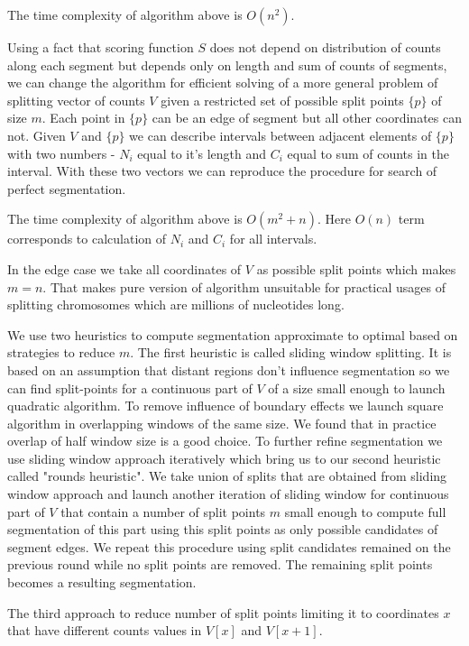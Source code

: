 \documentclass[10pt,letterpaper]{article}
\begin{document}
The time complexity of algorithm above is $O(n^2)$.

Using a fact that scoring function $S$ does not depend on distribution of counts along each segment
but depends only on length and sum of counts of segments, we can change the algorithm for efficient solving of a more general problem of
splitting vector of counts $V$ given a restricted set of possible split points $\{p\}$ of size $m$.
Each point in $\{p\}$ can be an edge of segment but all other coordinates can not.
Given $V$ and $\{p\}$ we can describe intervals between adjacent elements of $\{p\}$ with two numbers - $N_i$ equal to it's length
and $C_i$ equal to sum of counts in the interval.
With these two vectors we can reproduce the procedure for search of perfect segmentation. 

The time complexity of algorithm above is $O(m^2 + n)$. Here $O(n)$ term corresponds to calculation of $N_i$ and $C_i$ for all intervals.

In the edge case we take all coordinates of $V$ as possible split points which makes $m = n$. 
That makes pure version of algorithm unsuitable for practical usages of splitting chromosomes which are millions of nucleotides long.

We use two heuristics to compute segmentation approximate to optimal based on strategies to reduce $m$.
The first heuristic is called sliding window splitting.
It is based on an assumption that distant regions don't influence segmentation so we can find split-points for a continuous part of $V$ 
of a size small enough to launch quadratic algorithm.
To remove influence of boundary effects we launch square algorithm in overlapping windows of the same size.
We found that in practice overlap of half window size is a good choice. To further refine segmentation we use sliding window approach
iteratively which bring us to our second heuristic called "rounds heuristic".
We take union of splits that are obtained from sliding window approach and launch
another iteration of sliding window for continuous part of $V$ that contain a number of split points $m$ small enough to
compute full segmentation of this part using this split points as only possible candidates of segment edges.
We repeat this procedure using split candidates remained on the previous round while no split points are removed.
The remaining split points becomes a resulting segmentation.

The third approach to reduce number of split points limiting it to coordinates $x$ that have different counts values in $V[x]$ and $V[x+1]$. 
\end{document}
